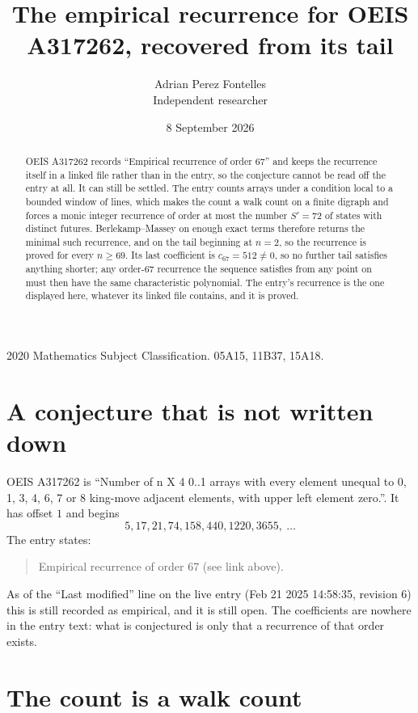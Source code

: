 \documentclass[11pt,a4paper]{article}
\title{The empirical recurrence for OEIS A317262, recovered from its tail}
\author{Adrian Perez Fontelles\\ \small Independent researcher}
\date{8 September 2026}
\theoremstyle{plain}
\theoremstyle{definition}
\begin{document}
\maketitle

\begin{abstract}
OEIS A317262 records ``Empirical recurrence of order $67$'' and keeps the recurrence itself in
a linked file rather than in the entry, so the conjecture cannot be read off the entry at all.
It can still be settled. The entry counts arrays under a condition local to a bounded window of
lines, which makes the count a walk count on a finite digraph and forces a monic integer
recurrence of order at most the number $S'=72$ of states with distinct futures. Berlekamp--Massey on
enough exact terms therefore returns the minimal such recurrence, and on the tail beginning at $n=2$, so the recurrence is proved for every $n\ge69$.
Its last coefficient is $c_{67}=512\neq0$, so no further tail satisfies anything
shorter; any order-$67$ recurrence the sequence satisfies from any point on must then have
the same characteristic polynomial. The entry's recurrence is the one displayed here, whatever
its linked file contains, and it is proved.
\end{abstract}

\noindent\small 2020 Mathematics Subject Classification. 05A15, 11B37, 15A18.\normalsize

\section{A conjecture that is not written down}

OEIS A317262 is ``Number of n X 4 0..1 arrays with every element unequal to 0, 1, 3, 4, 6, 7 or 8 king-move adjacent elements, with upper left element zero.''. It has offset $1$ and begins
\[
5, 17, 21, 74, 158, 440, 1220, 3655,\ \dots
\]
The entry states:
\begin{quote}
Empirical recurrence of order 67 (see link above).
\end{quote}
As of the ``Last modified'' line on the live entry (Feb 21 2025 14:58:35, revision 6)
this is still recorded as empirical, and it is still open. The coefficients are nowhere in the
entry text: what is conjectured is only that a recurrence of that order exists.

\section{The count is a walk count}
\end{document}
